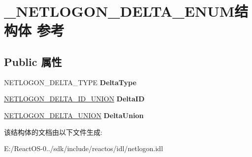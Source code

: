 \hypertarget{struct___n_e_t_l_o_g_o_n___d_e_l_t_a___e_n_u_m}{}\section{\+\_\+\+N\+E\+T\+L\+O\+G\+O\+N\+\_\+\+D\+E\+L\+T\+A\+\_\+\+E\+N\+U\+M结构体 参考}
\label{struct___n_e_t_l_o_g_o_n___d_e_l_t_a___e_n_u_m}
\subsection*{Public 属性}
\begin{DoxyCompactItemize}
\item 
\mbox{\label{struct___n_e_t_l_o_g_o_n___d_e_l_t_a___e_n_u_m_a4891f5f4ab613c1e21c9803c080ee047}} 
N\+E\+T\+L\+O\+G\+O\+N\+\_\+\+D\+E\+L\+T\+A\+\_\+\+T\+Y\+PE {\bfseries Delta\+Type}
\item 
\mbox{\label{struct___n_e_t_l_o_g_o_n___d_e_l_t_a___e_n_u_m_a2bb7db3820949b75470ebdc7b22bc583}} 
\hyperlink{union___n_e_t_l_o_g_o_n___d_e_l_t_a___i_d___u_n_i_o_n}{N\+E\+T\+L\+O\+G\+O\+N\+\_\+\+D\+E\+L\+T\+A\+\_\+\+I\+D\+\_\+\+U\+N\+I\+ON} {\bfseries Delta\+ID}
\item 
\mbox{\label{struct___n_e_t_l_o_g_o_n___d_e_l_t_a___e_n_u_m_a092d09a5129c21b45dfee2e4ebf2caf2}} 
\hyperlink{union___n_e_t_l_o_g_o_n___d_e_l_t_a___u_n_i_o_n}{N\+E\+T\+L\+O\+G\+O\+N\+\_\+\+D\+E\+L\+T\+A\+\_\+\+U\+N\+I\+ON} {\bfseries Delta\+Union}
\end{DoxyCompactItemize}


该结构体的文档由以下文件生成\+:\begin{DoxyCompactItemize}
\item 
E\+:/\+React\+O\+S-\/0../sdk/include/reactos/idl/netlogon.\+idl\end{DoxyCompactItemize}
